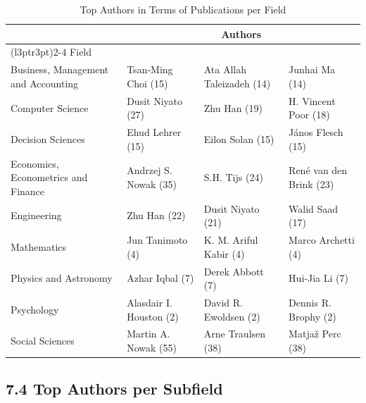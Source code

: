 \documentclass[
  12pt,
]{article}
\begin{document}
\begin{table}[H]

\caption{\label{tab:authors per field}Top Authors in Terms of Publications per Field}
\centering
\fontsize{8}{10}\selectfont
\begin{tabular}[t]{llll}
\toprule
\multicolumn{1}{c}{ } & \multicolumn{3}{c}{Authors} \\
\cmidrule(l{3pt}r{3pt}){2-4}
Field &  &  & \\
\midrule
Business, Management and Accounting & Tsan‐Ming Choi (15) & Ata Allah Taleizadeh (14) & Junhai Ma (14)\\
Computer Science & Dusit Niyato (27) & Zhu Han (19) & H. Vincent Poor (18)\\
Decision Sciences & Ehud Lehrer (15) & Eilon Solan (15) & János Flesch (15)\\
Economics, Econometrics and Finance & Andrzej S. Nowak (35) & S.H. Tijs (24) & René van den Brink (23)\\
Engineering & Zhu Han (22) & Dusit Niyato (21) & Walid Saad (17)\\
Mathematics & Jun Tanimoto (4) & K. M. Ariful Kabir (4) & Marco Archetti (4)\\
Physics and Astronomy & Azhar Iqbal (7) & Derek Abbott (7) & Hui‐Jia Li (7)\\
Psychology & Alasdair I. Houston (2) & David R. Ewoldsen (2) & Dennis R. Brophy (2)\\
Social Sciences & Martin A. Nowak (55) & Arne Traulsen (38) & Matjaž Perc (38)\\
\bottomrule
\end{tabular}
\end{table}

\newpage

\subsection{7.4 Top Authors per
Subfield}\label{top-authors-per-subfield}
\end{document}
